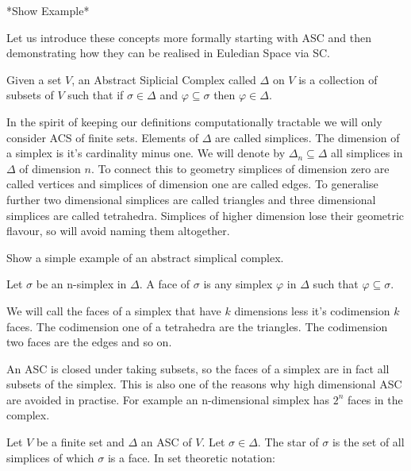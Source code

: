 *Show Example*

Let us introduce these concepts more formally starting with ASC and then demonstrating how they can be realised in Euledian Space via SC.

\begin{defn} Given a set $V$, an Abstract Siplicial Complex called $\Delta$ on $V$ is a collection of subsets of $V$ such that if $\sigma \in \Delta$ and $\varphi \subseteq \sigma$ then $\varphi \in \Delta$.  \end{defn}

In the spirit of keeping our definitions computationally tractable we will only consider ACS of finite sets. Elements of $\Delta$ are called simplices. The dimension of a simplex is it's cardinality minus one. We will denote by $\Delta_n \subseteq \Delta$ all simplices in $\Delta$ of dimension $n$. To connect this to geometry simplices of dimension zero are called vertices and simplices of dimension one are called edges. To generalise further two dimensional simplices are called triangles and three dimensional simplices are called tetrahedra. Simplices of higher dimension lose their geometric flavour, so will avoid naming them altogether.

\begin{ex} Show a simple example of an abstract simplical complex. \end{ex}


\begin{defn} Let $\sigma$ be an n-simplex in $\Delta$. A face of $\sigma$ is any simplex $\varphi$ in $\Delta$ such that $\varphi \subseteq \sigma$. \end{defn}

We will call the faces of a simplex that have $k$ dimensions less it's codimension $k$ faces. The codimension one of a tetrahedra are the triangles. The codimension two faces are the edges and so on. 

An ASC is closed under taking subsets, so the faces of a simplex are in fact all subsets of the simplex. This is also one of the reasons why high dimensional ASC are avoided in practise. For example an n-dimensional simplex has $2^n$ faces in the complex.

\begin{defn} Let $V$ be a finite set and $\Delta$ an ASC of $V$. Let $\sigma \in \Delta$. The star of $\sigma$ is the set of all simplices of which $\sigma$ is a face. In set theoretic notation:\end{defn}


